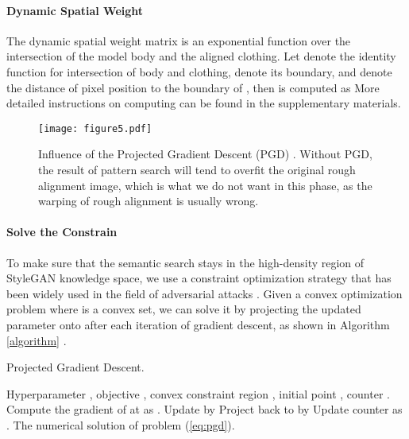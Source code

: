 \documentclass[10pt,twocolumn,letterpaper]{article}
\begin{document}
\paragraph{Dynamic Spatial Weight } The dynamic spatial weight matrix is an exponential function over the intersection of the model body and the aligned clothing. Let  denote the identity function for intersection of body and clothing,  denote its boundary, and  denote the distance of pixel position  to the boundary of , then  is computed as 
More detailed instructions on computing  can be found in the supplementary materials.



\begin{figure}[t]
  \centering
  \texttt{[image: figure5.pdf]}\caption{Influence of the Projected Gradient Descent (PGD) \cite{madry2017towards}. Without PGD, the result of pattern search will tend to overfit the original rough alignment image, which is what we do not want in this phase, as the warping of rough alignment is usually wrong.}\label{fig: PGD-ablation}\end{figure}




\paragraph{Solve the Constrain }To make sure that the semantic search stays in the high-density region of StyleGAN knowledge space, we use a constraint optimization strategy that has been widely used in the field of adversarial attacks \cite{guo2019simple, dong2018boosting,madry2017towards}. Given a convex optimization problem \cite{boyd2004convex}
where  is a convex set, we can solve it by projecting the updated parameter onto  after each iteration of gradient descent, as shown in Algorithm \ref{algorithm} \cite{madry2017towards}.
\begin{algorithm}[t]
	\caption{Projected Gradient Descent.}
	\label{algorithm}
	\begin{algorithmic}
		 Hyperparameter , objective , convex constraint region , initial point , counter .\REPEAT
		\STATE Compute the gradient of  at  as .
		\STATE Update  by
		\STATE Project  back to  by 
		\STATE Update counter as .
		 The numerical solution  of problem (\ref{eq:pgd}).
	\end{algorithmic}
\end{algorithm}
\end{document}
